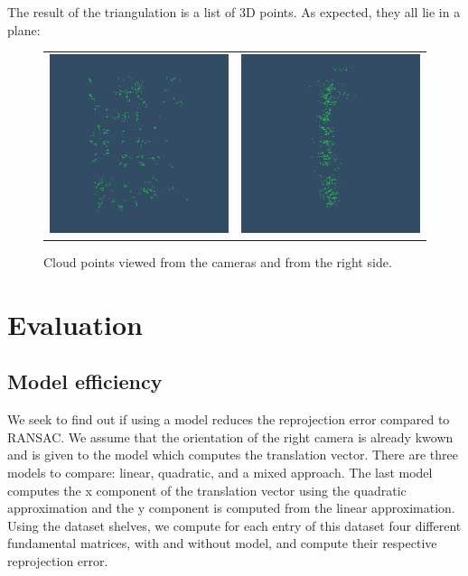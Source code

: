 \documentclass[11pt]{report}
\begin{document}
The result of the triangulation is a list of 3D points. As expected, they all lie in a plane:
\begin{figure}[H]
\centering
\begin{tabular}{cc}
\includegraphics[scale=0.5]{images/cloud1.png} &
\includegraphics[scale=0.5]{images/cloud2.png} \\
\end{tabular}
\caption{Cloud points viewed from the cameras and from the right side.}
\end{figure}


\chapter{Evaluation}

\section{Model efficiency}

We seek to find out if using a model reduces the reprojection error compared to RANSAC. We assume that the orientation of the right camera is already kwown and is given to the model which computes the translation vector. There are three models to compare: linear, quadratic, and a mixed approach. The last model computes the x component of the translation vector using the quadratic approximation and the y component is computed from the linear approximation. Using the dataset shelves, we compute for each entry of this dataset four different fundamental matrices, with and without model, and compute their respective reprojection error.
\end{document}
